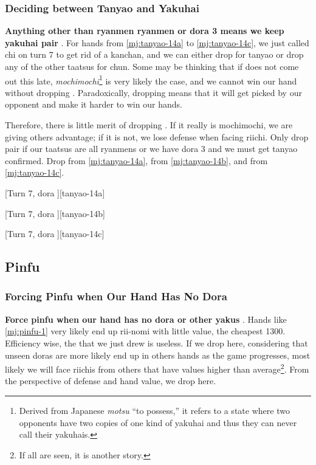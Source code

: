 \documentclass[12pt]{article}
\newlength\stdbls %
\newcommand{\mjfn}[1]{\raisebox{-.135\stdbls}{\mahjong[0.75\stdbls]{#1}}}
\begin{document}
\subsubsection*{Deciding between Tanyao and Yakuhai}

\textbf{Anything other than ryanmen ryanmen or dora 3 means we keep yakuhai pair} \citep[][pp.~177--180]{kawamura-naki}. For hands from \ref{mj:tanyao-14a} to \ref{mj:tanyao-14c}, we just called  chi on turn 7 to get rid of a kanchan, and we can either drop  for tanyao or drop any of the other taatsus for chun. Some may be thinking that if  does not come out this late, \textit{mochimochi}\footnote{Derived from Japanese \textit{motsu} ``to possess,'' it refers to a state where two opponents have two copies of one kind of yakuhai and thus they can never call their yakuhais.} is very likely the case, and we cannot win our hand without dropping . Paradoxically, dropping  means that it will get picked by our opponent and make it harder to win our hands.

Therefore, there is little merit of dropping . If it really is mochimochi, we are giving others advantage; if it is not, we lose defense when facing riichi. Only drop  pair if our taatsus are all ryanmens or we have dora 3 and we must get tanyao confirmed. Drop  from \ref{mj:tanyao-14a},  from \ref{mj:tanyao-14b}, and  from \ref{mj:tanyao-14c}.

[Turn 7, dora ][tanyao-14a]

[Turn 7, dora ][tanyao-14b]

[Turn 7, dora ][tanyao-14c]


\subsection{Pinfu}

\subsubsection*{Forcing Pinfu when Our Hand Has No Dora}

\textbf{Force pinfu when our hand has no dora or other yakus} \citep[][pp.~200--201]{doi-prob}. Hands like \ref{mj:pinfu-1} very likely end up rii-nomi with little value, the cheapest 1300. Efficiency wise, the  that we just drew is useless. If we drop  here, considering that unseen doras are more likely end up in others hands as the game progresses, most likely we will face riichis from others that have values higher than average\footnote{If all \mjfn{8p} are seen, it is another story.}. From the perspective of defense and hand value, we drop  here.
\end{document}
